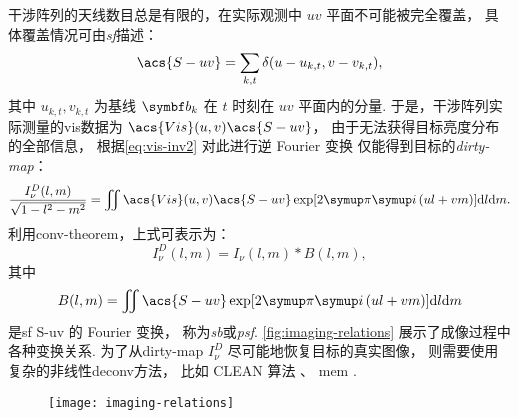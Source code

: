 干涉阵列的天线数目总是有限的，在实际观测中 $uv$ 平面不可能被完全覆盖，
具体覆盖情况可由\emph{\acf{sf}}描述：
\begin{equation}
  \label{eq:sf}
  \acs{S-uv} = \sum_{k,t} \delta(u - u_{k,t}, v - v_{k,t}),
\end{equation}
其中 $u_{k,t}, v_{k,t}$ 为基线 $\B{b}_k$ 在 $t$ 时刻在 $uv$ 平面内的分量.
于是，干涉阵列实际测量的\ac{vis}数据为 $\acs{Vis}(u,v) \acs{S-uv}$，
由于无法获得目标亮度分布的全部信息，
根据\autoref{eq:vis-inv2} 对此进行逆 Fourier 变换
仅能得到目标的\emph{\acf{dirty-map}}：
\begin{equation}
  \label{eq:dirty-map}
  \frac{I_{\nu}^D(l,m)}{\sqrt{1-l^2-m^2}} = \iint
    \acs{Vis}(u,v) \acs{S-uv} \exp [2\Cpi\Ci\, (ul+vm)] \D{l}\D{m}.
\end{equation}
利用\ac{conv-theorem}，上式可表示为：
\begin{equation}
  I_{\nu}^D(l,m) = I_{\nu}(l,m) * B(l,m),
\end{equation}
其中
\begin{equation}
  \label{eq:syn-beam}
  B(l,m) = \iint \acs{S-uv} \exp [2\Cpi\Ci\, (ul+vm)] \D{l}\D{m}
\end{equation}
是\ac{sf} \acs{S-uv} 的 Fourier 变换，
称为\emph{\acf{sb}}或\emph{\acf{psf}}.
\autoref{fig:imaging-relations} 展示了成像过程中各种变换关系.
为了从\ac{dirty-map} $I_{\nu}^D$ 尽可能地恢复目标的真实图像，
则需要使用复杂的非线性\ac{deconv}方法，
比如 CLEAN 算法 \cite{hogbom1974,cornwell1999}、
\ac{mem} \cite{narayan1986}.

\begin{figure}[htp]
  \centering
  \texttt{[image: imaging-relations]}
  \label{fig:imaging-relations}
\end{figure}

